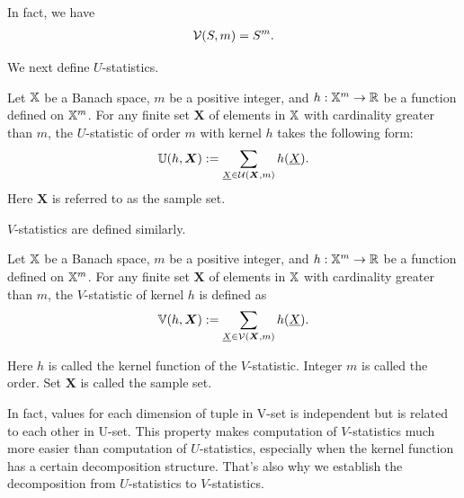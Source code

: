 \documentclass[letterpaper,11pt]{article}
\newcommand{\uset}{\calU}
\newcommand{\usetp}[2]{\uset(#1,#2)}
\newcommand{\vset}{\calV}
\newcommand{\vsetp}[2]{\vset(#1,#2)}
\newcommand{\ustat}{\mathbb{U}}
\newcommand{\vstat}{\mathbb{V}}
\begin{document}
\begin{bibunit}[plainnat]
\begin{remark}
    In fact, we have
    \begin{align*}
        \vsetp{S}{m} = S^m.
    \end{align*}
\end{remark}
We next define $U$-statistics.

\begin{definition}[$U$-statistics]\label{def:u_stat}
Let ${\mathbb{X}}$ be a Banach space, $m$ be a positive integer, and $h: {\mathbb{X}}^{m} \rightarrow {\mathbb{R}}$ be a function defined on ${\mathbb{X}}^m$. For any finite set $\bm{X}$ of elements in ${\mathbb{X}}$ with cardinality greater than $m$, the $U$-statistic of order $m$ with kernel $h$ takes the following form: 
    \begin{align*}
        \ustat(h,\bm{X}) := \sum_{\underline{X} \in \usetp{\bm{X}}{m}} h(\underline{X}). 
    \end{align*}
    Here $\bm{X}$ is referred to as the sample set.
\end{definition}

$V$-statistics are defined similarly.
\begin{definition}[$V$-statistics]\label{def:v_stat}
    Let ${\mathbb{X}}$ be a Banach space, $m$ be a positive integer, and $h: {\mathbb{X}}^{m} \rightarrow {\mathbb{R}}$ be a function defined on ${\mathbb{X}}^m$. For any finite set $\bm{X}$ of elements in ${\mathbb{X}}$ with cardinality greater than $m$, the $V$-statistic of kernel $h$ is defined as 
    \begin{align*}
        \vstat(h,\bm{X}) := \sum_{\underline{X} \in \vsetp{\bm{X}}{m}} h(\underline{X}).
    \end{align*}

    Here $h$ is called the kernel function of the $V$-statistic. Integer $m$ is called the order. Set $\bm{X}$ is called the sample set. 
    
\end{definition}


\begin{remark}
    In fact, values for each dimension of tuple in V-set is independent but is related to each other in U-set. This property makes computation of $V$-statistics much more easier than computation of $U$-statistics, especially when the kernel function has a certain decomposition structure. 
    That's also why we establish the decomposition from $U$-statistics to $V$-statistics. 
\end{remark}

\end{bibunit}
\end{document}
